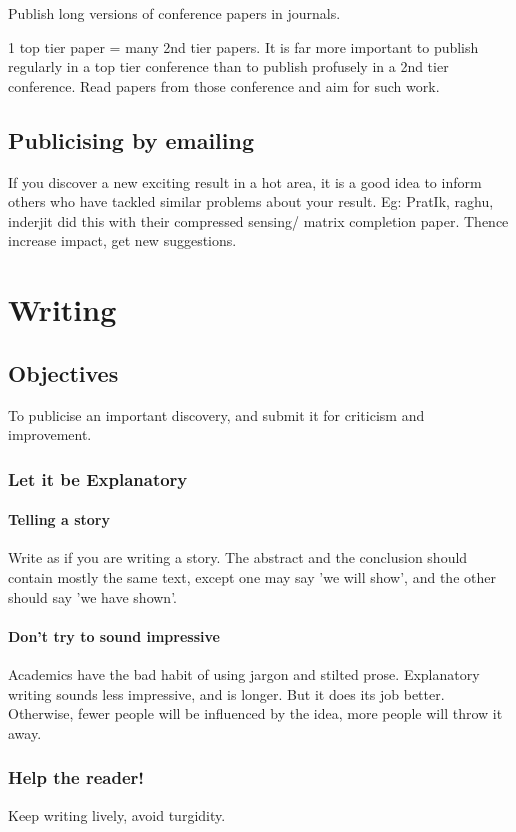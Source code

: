 \documentclass[oneside, article]{memoir}
\begin{document}
Publish long versions of conference papers in journals.

1 top tier paper = many 2nd tier papers. It is far more important to publish regularly in a top tier conference than to publish profusely in a 2nd tier conference. Read papers from those conference and aim for such work.

\subsection{Publicising by emailing}
If you discover a new exciting result in a hot area, it is a good idea to inform others who have tackled similar problems about your result. Eg: PratIk, raghu, inderjit did this with their compressed sensing/ matrix completion paper. Thence increase impact, get new suggestions.

\section{Writing}
\subsection{Objectives}
To publicise an important discovery, and submit it for criticism and improvement.

\subsubsection{Let it be Explanatory}
\paragraph*{Telling a story}
Write as if you are writing a story. The abstract and the conclusion should contain mostly the same text, except one may say 'we will show', and the other should say 'we have shown'.

\paragraph*{Don't try to sound impressive}
Academics have the bad habit of using jargon and stilted prose. Explanatory writing sounds less impressive, and is longer. But it does its job better. Otherwise, fewer people will be influenced by the idea, more people will throw it away.

\subsubsection{Help the reader!}
Keep writing lively, avoid turgidity.
\end{document}
